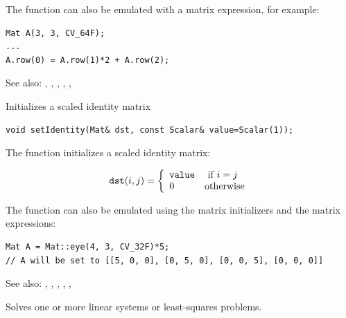 The function can also be emulated with a matrix expression, for example:

\begin{lstlisting}
Mat A(3, 3, CV_64F);
...
A.row(0) = A.row(1)*2 + A.row(2);
\end{lstlisting}

See also: , , , , , 

\label{setIdentity}
Initializes a scaled identity matrix

\begin{lstlisting}
void setIdentity(Mat& dst, const Scalar& value=Scalar(1));
\end{lstlisting}
\begin{description}
\end{description}

The function  initializes a scaled identity matrix:

\[
\texttt{dst}(i,j)=\left\{ \begin{array}{l l} \texttt{value} & \mbox{ if $i=j$}\\ 0 & \mbox{otherwise}\\ \end{array} \right.
\]

The function can also be emulated using the matrix initializers and the matrix expressions:
\begin{lstlisting}
Mat A = Mat::eye(4, 3, CV_32F)*5;
// A will be set to [[5, 0, 0], [0, 5, 0], [0, 0, 5], [0, 0, 0]]
\end{lstlisting}

See also: , , ,
, ,

\label{solve}
Solves one or more linear systems or least-squares problems.


